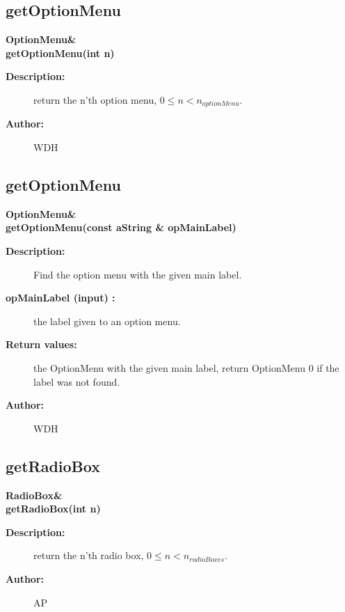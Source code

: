 \subsection{getOptionMenu}
 
\begin{flushleft} \textbf{%
OptionMenu\&  \\ 
\settowidth{\DialogDataIncludeArgIndent}{getOptionMenu(}%
getOptionMenu(int n)
}\end{flushleft}
\begin{description}
\item[{\bf Description:}]  
    return the n'th option menu, $0 \leq n < n_{optionMenu}$.
\item[{\bf Author:}]  WDH
\end{description}
\subsection{getOptionMenu}
 
\begin{flushleft} \textbf{%
OptionMenu\&  \\ 
\settowidth{\DialogDataIncludeArgIndent}{getOptionMenu(}%
getOptionMenu(const aString \& opMainLabel)
}\end{flushleft}
\begin{description}
\item[{\bf Description:}]  
    Find the option menu with the given main label.
\item[{\bf opMainLabel (input) :}]  the label given to an option menu.
\item[{\bf Return values:}]  the OptionMenu with the given main label, return OptionMenu 0
 if the label was not found.
\item[{\bf Author:}]  WDH
\end{description}
\subsection{getRadioBox}
 
\begin{flushleft} \textbf{%
RadioBox\&  \\ 
\settowidth{\DialogDataIncludeArgIndent}{getRadioBox(}%
getRadioBox(int n)
}\end{flushleft}
\begin{description}
\item[{\bf Description:}]  
    return the n'th radio box, $0 \leq n < n_{radioBoxes}$.
\item[{\bf Author:}]  AP
\end{description}
